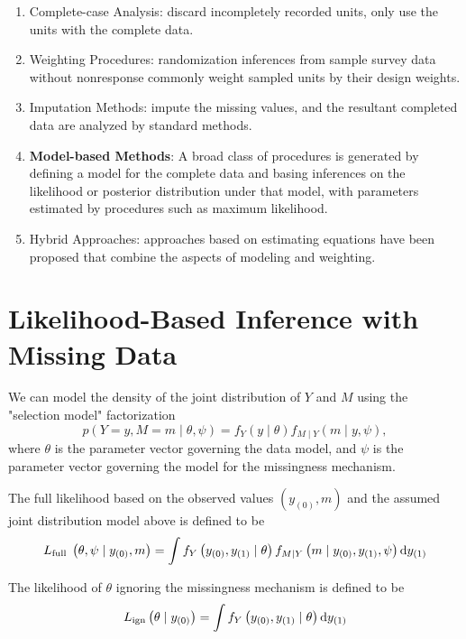 \begin{enumerate}
	\item Complete-case Analysis: discard incompletely recorded units, only use the units with the complete data.
	\item Weighting Procedures: randomization inferences from sample survey data without nonresponse commonly weight sampled units by their design weights.
	\item Imputation Methods: impute the missing values, and the resultant completed data are analyzed by standard methods.
	\item \textbf{Model-based Methods}: A broad class of procedures is generated by defining a model for the complete data and basing inferences on the likelihood or posterior distribution under that model, with parameters estimated by procedures such as maximum likelihood.
	\item Hybrid Approaches: approaches based on estimating equations have been
	      proposed that combine the aspects of modeling and weighting.
\end{enumerate}

\section{Likelihood-Based Inference with Missing Data}

We can model the density of the joint distribution of $Y$ and $M$ using the "selection model" factorization
\begin{equation*}
	p(Y=y,M=m\mid\theta,\psi)=f_{Y}(y\mid\theta)f_{M\mid Y}(m\mid y,\psi),
\end{equation*}
where $\theta$ is the parameter vector governing the data model, and $\psi$ is the parameter vector governing the model for the missingness mechanism.

The full likelihood based on the observed values $\left(y_{(0)}, m\right)$ and the assumed joint distribution model above is defined to be
\begin{equation}
	L_{\text {full }}\left(\theta, \psi \mid y_{(0)}, m\right)=\int f_{Y}\left(y_{(0)}, y_{(1)} \mid \theta\right) f_{M \mid Y}\left(m \mid y_{(0)}, y_{(1)}, \psi\right) \mathop{}\!\mathrm{d} y_{(1)}
\end{equation}

The likelihood of $\theta$ ignoring the missingness mechanism is defined to be
\begin{equation}
	L_{\mathrm{ign}}\left(\theta \mid y_{(0)}\right)=\int f_{Y}\left(y_{(0)}, y_{(1)} \mid \theta\right) \mathop{}\!\mathrm{d} y_{(1)}
\end{equation}

